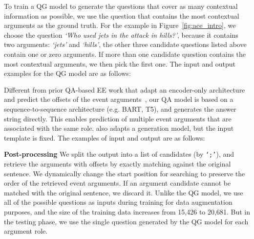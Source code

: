 To train a QG model to generate the questions that cover as many contextual information as possible, we use the question that contains the most contextual arguments as the ground truth. For the example in Figure~\ref{fig:ace_intro}, we choose the question \textit{`Who used jets in the attack in hills?'}, because it contains two arguments: \textit{`jets'} and \textit{`hills'}, the other three candidate questions listed above contain one or zero arguments. If more than one candidate question contains the most contextual arguments, we then pick the first one. The input and output examples for the QG model are as follows: 

\noindent{}

 

 
 

 
 

 
\label{sec:qa_model}
Different from prior QA-based EE work that adapt an encoder-only architecture and predict the offsets of the event arguments~\cite{chen2019reading, du2020event,li2020event,liu2020event,feng2020probing,lyu2021zero,zhou2021role}, our QA model is based on a sequence-to-sequence architecture (e.g. BART, T5), and generates the answer string directly.
This enables prediction of multiple event arguments that are associated with the same role. \citet{li2021document} also adapts a generation model, but the input template is fixed. The examples of input and output are as follows:

\noindent{}
 

 
 
 
 

 

\noindent\textbf{Post-processing}
We split the output into a list of candidates (by \texttt{`;'}), and retrieve the arguments with offsets by exactly matching against the original sentence.
We dynamically change the start position for searching to preserve the order of the retrieved event arguments. 
If an argument candidate cannot be matched with the original sentence, we discard it.
Unlike the QG model, we use all of the possible questions as inputs during training for data augmentation purposes, and the size of the training data increases from 15,426 to 20,681.
But in the testing phase, we use the single question generated by the QG model for each argument role.

